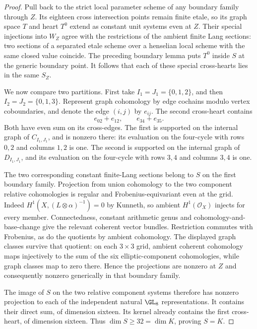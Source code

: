 \begin{proof}
Pull back to the strict local parameter scheme of any
boundary family through $Z$. Its eighteen cross intersection
points remain finite etale, so its graph space $T$ and
heart $T^0$ extend as constant unit systems even at $Z$.
Their special injections into $W_Z$ agree with the
restrictions of the ambient finite Lang sections: two
sections of a separated etale scheme over a henselian
local scheme with the same closed value coincide.
The preceding boundary lemma puts $T^0$ inside $S$ at
the generic boundary point. It follows that each of these
special cross-hearts lies in the same $S_Z$.

We now compare two partitions. First take
$I_1=J_1=\{0,1,2\}$, and then
$I_2=J_2=\{0,1,3\}$.
Represent graph cohomology by edge cochains modulo vertex
coboundaries, and denote the edge $(i,j)$ by $e_{ij}$.
The second cross-heart contains
\[
                       e_{02}+e_{12},\qquad e_{34}+e_{35}.
\]
Both have even sum on its cross-edges. The first is supported
on the internal graph of $C_{I_1,J_1}$, and is nonzero
there: its evaluation on the four-cycle with rows $0,2$
and columns $1,2$ is one. The second is supported on the
internal graph of $D_{I_1,J_1}$, and its evaluation on
the four-cycle with rows $3,4$ and columns $3,4$ is one.

The two corresponding constant finite-Lang sections belong
to $S$ on the first boundary family. Projection from union
cohomology to the two component relative cohomologies is
regular and Frobenius-equivariant even at the grid. Indeed
$H^1(X,(L\otimes\alpha)^{-1})=0$ by Kunneth, so ambient
$H^1(\mathcal O_X)$ injects for every member. Connectedness,
constant arithmetic genus and cohomology-and-base-change give
the relevant coherent vector bundles. Restriction commutes
with Frobenius, as do the quotients by ambient cohomology.
The displayed graph classes survive that quotient: on each
$3\times3$ grid, ambient coherent cohomology maps injectively
to the sum of the six elliptic-component cohomologies, while
graph classes map to zero there. Hence the projections are nonzero at
$Z$ and consequently nonzero generically in that boundary
family.

The image of $S$ on the two relative component systems
therefore has nonzero projection to each of the independent
natural $\GL_8$ representations. It contains their direct
sum, of dimension sixteen. Its kernel already contains
the first cross-heart, of dimension sixteen. Thus
$\dim S\ge32=\dim K$, proving $S=K$.
\end{proof}

